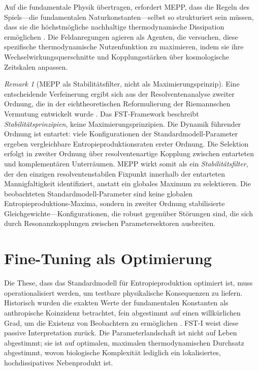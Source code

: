 \documentclass[12pt,a4paper]{article}
\theoremstyle{remark}
\newtheorem{remark}{Remark}
\begin{document}
Auf die fundamentale Physik \"ubertragen, erfordert MEPP, dass die Regeln des Spiels---die fundamentalen Naturkonstanten---selbst so strukturiert sein m\"ussen, dass sie die h\"ochstm\"ogliche nachhaltige thermodynamische Dissipation erm\"oglichen \citep{EntropyMaximum}. Die Feldanregungen agieren als Agenten, die versuchen, diese spezifische thermodynamische Nutzenfunktion zu maximieren, indem sie ihre Wechselwirkungsquerschnitte und Kopplungsst\"arken \"uber kosmologische Zeitskalen anpassen.

\begin{remark}[MEPP als Stabilit\"atsfilter, nicht als Maximierungsprinzip]
\label{rem:mepp-stability-filter}
Eine entscheidende Verfeinerung ergibt sich aus der Resolventenanalyse zweiter Ordnung, die in der eichtheoretischen Reformulierung der Riemannschen Vermutung entwickelt wurde \citep{GeigerRH2026b}. Das FST-Framework beschreibt \emph{Stabilit\"atsprinzipien}, keine Maximierungsprinzipien. Die Dynamik f\"uhrender Ordnung ist entartet: viele Konfigurationen der Standardmodell-Parameter ergeben vergleichbare Entropieproduktionsraten erster Ordnung. Die Selektion erfolgt in zweiter Ordnung \"uber resolventenartige Kopplung zwischen entarteten und komplement\"aren Unterr\"aumen. MEPP wirkt somit als ein \emph{Stabilit\"atsfilter}, der den einzigen resolventenstabilen Fixpunkt innerhalb der entarteten Mannigfaltigkeit identifiziert, anstatt ein globales Maximum zu selektieren. Die beobachteten Standardmodell-Parameter sind keine globalen Entropieproduktions-Maxima, sondern in zweiter Ordnung stabilisierte Gleichgewichte---Konfigurationen, die robust gegen\"uber St\"orungen sind, die sich durch Resonanzkopplungen zwischen Parametersektoren ausbreiten.
\end{remark}

\section{Fine-Tuning als Optimierung}
\label{sec:finetuning}

Die These, dass das Standardmodell f\"ur Entropieproduktion optimiert ist, muss operationalisiert werden, um testbare physikalische Konsequenzen zu liefern. Historisch wurden die exakten Werte der fundamentalen Konstanten als anthropische Koinzidenz betrachtet, fein abgestimmt auf einen willk\"urlichen Grad, um die Existenz von Beobachtern zu erm\"oglichen \citep{Adams2019}. FST-I weist diese passive Interpretation zur\"uck. Die Parameterlandschaft ist nicht auf Leben abgestimmt; sie ist auf optimalen, maximalen thermodynamischen Durchsatz abgestimmt, wovon biologische Komplexit\"at lediglich ein lokalisiertes, hochdissipatives Nebenprodukt ist.
\end{document}
